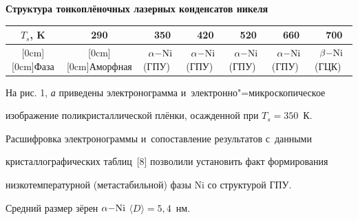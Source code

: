 \begin{table}[h!]

\centering \footnotesize

\textbf{Структура тонкоплёночных лазерных конденсатов никеля}

\begin{tabular}{c|c|p{0.85cm}|p{0.85cm}|p{0.85cm}|p{0.85cm}|p{0.85cm}}

\hline

$T_{s}$, K&

290&

~~350&

~~420&

~~520&

~~660&

~~700 \\

\hline

\raisebox{-1.5ex}[0cm][0cm]{Фаза}&

\raisebox{-1.5ex}[0cm][0cm]{Аморфная}&

~$\alpha \rm{-}Ni$ (ГПУ)&

~$\alpha \rm{-}Ni$ (ГПУ)&

~$\alpha \rm{-}Ni$ (ГПУ)&

~$\alpha \rm{-}Ni$ (ГПУ)&

~$\beta \rm{-}Ni$ (ГЦК) \\

\hline

\end{tabular}



\end{table}





На рис. 1, {\sl а} приведены электронограмма и~электронно"=микроскопическое

изображение поликристаллической плёнки, осажденной при $T_{s} = 350$~К.

Расшифровка электронограммы и~сопоставление результатов с~данными

кристаллографических таблиц~[8] позволили установить факт формирования

низкотемпературной (метастабильной) фазы Ni со структурой ГПУ.

Средний размер зёрен $\alpha \rm{-}Ni$ $\langle D \rangle  = 5,4$~нм.



